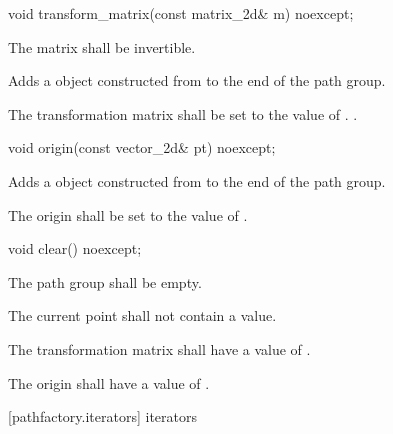 \begin{itemdecl}
    void transform_matrix(const matrix_2d& m) noexcept;
\end{itemdecl}
\begin{itemdescr}
	\pnum
	\requires
	The matrix  shall be invertible.
	
	\pnum
	\effects
	Adds a  object constructed from  to the end of the path group.
	
	\pnum
	The transformation matrix shall be set to the value of .
	.
\end{itemdescr}

\begin{itemdecl}
    void origin(const vector_2d& pt) noexcept;
\end{itemdecl}
\begin{itemdescr}
	\pnum
	\effects
	Adds a  object constructed from  to the end of the path group.
	
	\pnum
	The origin shall be set to the value of .
\end{itemdescr}

\begin{itemdecl}
    void clear() noexcept;
\end{itemdecl}
\begin{itemdescr}
	\pnum
	\postconditions
	\pnum
	The path group shall be empty.
	
	\pnum
	The current point shall not contain a value.
	
	\pnum
	The transformation matrix shall have a value of .
	
	\pnum
	The origin shall have a value of .
\end{itemdescr}

 [pathfactory.iterators] { iterators}
    
